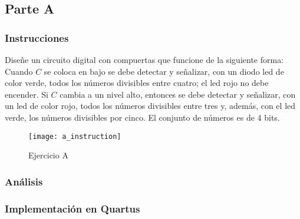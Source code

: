 \documentclass[../procedimientos.tex]{subfiles}
\begin{document}
\clearpage
\subsection{Parte A}
\subsubsection{Instrucciones}
Diseñe un circuito digital con compuertas que funcione de la siguiente forma:
Cuando $C$ se coloca en bajo se debe detectar y señalizar, con un diodo led de 
color verde, todos los números divisibles entre cuatro; el led rojo no debe 
encender. Si $C$ cambia a un nivel alto, entonces se debe detectar y 
señalizar, con un led de color rojo, todos los números divisibles entre tres 
y, además, con el led verde, los números divisibles por cinco. El conjunto de 
números es de 4 bits.
\begin{figure}[H]
  \centering
  \texttt{[image: a\_instruction]}
  \caption{Ejercicio A}
  \label{fig:a_inst}
\end{figure}

\subsubsection{Análisis}\label{subs:analisis_a}

\subsubsection{Implementación en Quartus}\label{subs:a_imp}
\end{document}
